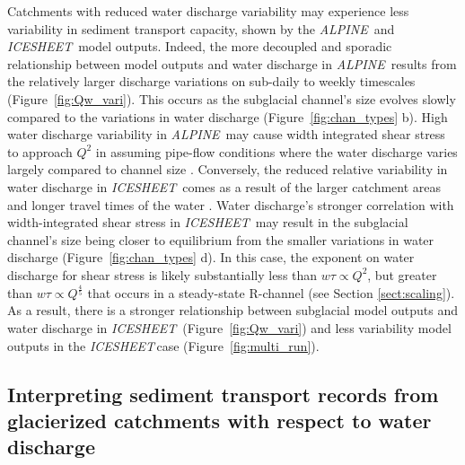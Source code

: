 \documentclass[tc, manuscript]{copernicus}
\newcommand{\alpine}{\textit{ALPINE}\,}
\newcommand{\icesheet}{\textit{ICESHEET}\,}
\begin{document}
Catchments with reduced water discharge variability may experience less variability in sediment transport capacity, shown by the \alpine{} and \icesheet{} model outputs.
Indeed, the more decoupled and sporadic relationship between model outputs and water discharge in \alpine{} results from the relatively larger discharge variations on sub-daily to weekly timescales (Figure~\ref{fig:Qw_vari}).
This occurs as the subglacial channel's size evolves slowly compared to the variations in water discharge (Figure~\ref{fig:chan_types} b).
High water discharge variability in \alpine{} may cause width integrated shear stress to approach $Q^{2}$ in assuming pipe-flow conditions where the water discharge varies largely compared to channel size \citep[Figure~\ref{fig:chan_types}; Section \ref{sect:scaling}; c.f.][]{alley1997}.
Conversely, the reduced relative variability in water discharge in \icesheet{} comes as a result of the larger catchment areas and longer travel times of the water \citep[e.g.][]{vanas2017}.
Water discharge's stronger correlation with width-integrated shear stress in \icesheet{} may result in the subglacial channel's size being closer to equilibrium from the smaller variations in water discharge (Figure~\ref{fig:chan_types} d).
In this case, the exponent on water discharge for shear stress is likely substantially less than $w\tau \propto Q^2$, but greater than $w \tau \propto Q^{\frac{4}{5}}$ that occurs in a steady-state R-channel (see Section \ref{sect:scaling}).
As a result, there is a stronger relationship between subglacial model outputs and water discharge in \icesheet{} (Figure~\ref{fig:Qw_vari}) and less variability model outputs in the \icesheet case (Figure~\ref{fig:multi_run}).

\subsection{Interpreting sediment transport records from glacierized catchments with respect to water discharge}
\end{document}
